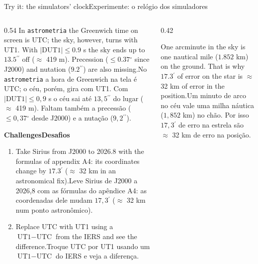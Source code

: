 \documentclass[aspectratio=169,11pt]{beamer}
\newcommand{\tr}[2]{\ifEN#2\else#1\fi}
\newcommand{\bnum}[1]{\textbf{\textcolor{mTeal}{#1}}}
\newcommand{\asec}{\ensuremath{{}^{\prime\prime}}}
\newcommand{\amin}{\ensuremath{{}^{\prime}}}
\newcommand{\gr}{\ensuremath{{}^{\circ}}}
\begin{document}
\begin{frame}{\tr{Experimente: o relógio dos simuladores}{Try it: the simulators' clock}}
  \begin{columns}[T]
    \begin{column}{0.54\textwidth}
      \small
      \tr{No \texttt{astrometria} a hora de Greenwich na tela é UTC; o céu, porém, gira com UT1. Com $|\text{DUT1}| \le 0{,}9$ s o céu sai até $13{,}5\asec$ do lugar ($\approx$ 419 m). Faltam também a precessão ($\le 0{,}37\gr$ desde J2000) e a nutação ($9{,}2\asec$).}{In \texttt{astrometria} the Greenwich time on screen is UTC; the sky, however, turns with UT1. With $|\text{DUT1}| \le 0.9$ s the sky ends up to $13.5\asec$ off ($\approx$ 419 m). Precession ($\le 0.37\gr$ since J2000) and nutation ($9.2\asec$) are also missing.}
      \medskip

      \bnum{\tr{Desafios}{Challenges}}
      \begin{enumerate}
        \setlength{\itemsep}{2pt}
        \item \tr{Leve Sirius de J2000 a 2026,8 com as fórmulas do apêndice A4: as coordenadas dele mudam $17{,}3\amin$ ($\approx$ 32 km num ponto astronômico).}{Take Sirius from J2000 to 2026.8 with the formulas of appendix A4: its coordinates change by $17.3\amin$ ($\approx$ 32 km in an astronomical fix).}
        \item \tr{Troque UTC por UT1 usando um $\text{UT1}-\text{UTC}$ do IERS e veja a diferença.}{Replace UTC with UT1 using a $\text{UT1}-\text{UTC}$ from the IERS and see the difference.}
      \end{enumerate}
    \end{column}
    \begin{column}{0.42\textwidth}
      \begin{ideia}[title={\tr{Ordem de grandeza}{Order of magnitude}}]
        \small\tr{Um minuto de arco no céu vale uma milha náutica ($1{,}852$ km) no chão. Por isso $17{,}3\amin$ de erro na estrela são $\approx$ 32 km de erro na posição.}{One arcminute in the sky is one nautical mile ($1.852$ km) on the ground. That is why $17.3\amin$ of error on the star is $\approx$ 32 km of error in the position.}
      \end{ideia}
    \end{column}
  \end{columns}
\end{frame}
\end{document}
